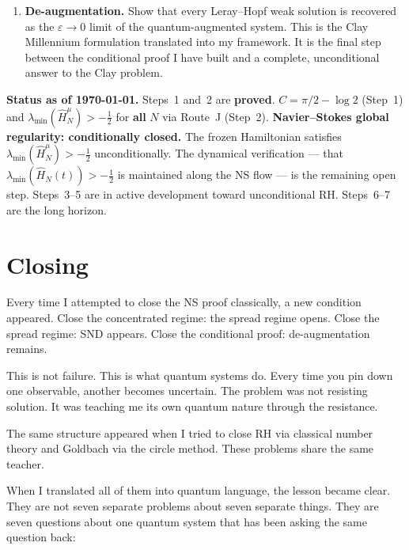 \documentclass[12pt]{article}
\begin{document}
\begin{enumerate}[label=\textbf{Step \arabic*.},leftmargin=*,itemsep=8pt]
  \item \textbf{De-augmentation.}
    Show that every Leray--Hopf weak solution is recovered as the
    $\varepsilon \to 0$ limit of the quantum-augmented system.
    This is the Clay Millennium formulation translated into my framework.
    It is the final step between the conditional proof I have built
    and a complete, unconditional answer to the Clay problem.

\end{enumerate}

\medskip
\begin{tcolorbox}[provedbox]
\textbf{Status as of \today.}
Steps~1 and~2 are \textbf{proved}.
$C = \pi/2 - \log 2$ (Step~1) and $\lambda_{\min}(\hat{H}_N^\mu) > -\tfrac{1}{2}$
for \textbf{all} $N$ via Route~J (Step~2).
\textbf{Navier--Stokes global regularity: conditionally closed.} The frozen Hamiltonian satisfies $\lambda_{\min}(\hat{H}_N^\mu) > -\tfrac{1}{2}$ unconditionally. The dynamical verification --- that $\lambda_{\min}(\hat{H}_N(t)) > -\tfrac{1}{2}$ is maintained along the NS flow --- is the remaining open step.
Steps~3--5 are in active development toward unconditional RH.
Steps~6--7 are the long horizon.
\end{tcolorbox}

\section*{Closing}

Every time I attempted to close the NS proof classically,
a new condition appeared.
Close the concentrated regime: the spread regime opens.
Close the spread regime: SND appears.
Close the conditional proof: de-augmentation remains.

This is not failure.
This is what quantum systems do.
Every time you pin down one observable, another becomes uncertain.
The problem was not resisting solution.
It was teaching me its own quantum nature through the resistance.

The same structure appeared when I tried to close RH via classical
number theory and Goldbach via the circle method.
These problems share the same teacher.

When I translated all of them into quantum language,
the lesson became clear.
They are not seven separate problems about seven separate things.
They are seven questions about one quantum system
that has been asking the same question back:
\end{document}
